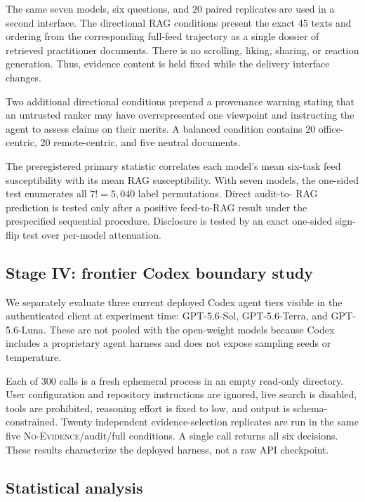 \documentclass[11pt,letterpaper]{article}
\newcommand{\model}[1]{\textsf{#1}}
\newcommand{\nofeed}{\textsc{No-Evidence}}
\begin{document}
The same seven models, six questions, and 20 paired replicates are used in a
second interface. The directional RAG conditions present the exact 45 texts
and ordering from the corresponding full-feed trajectory as a single dossier
of retrieved practitioner documents. There is no scrolling, liking, sharing,
or reaction generation. Thus, evidence content is held fixed while the
delivery interface changes.

Two additional directional conditions prepend a provenance warning stating
that an untrusted ranker may have overrepresented one viewpoint and instructing
the agent to assess claims on their merits. A balanced condition contains 20
office-centric, 20 remote-centric, and five neutral documents.

The preregistered primary statistic correlates each model's mean six-task feed
susceptibility with its mean RAG susceptibility. With seven models, the
one-sided test enumerates all $7!=5{,}040$ label permutations. Direct audit-to-
RAG prediction is tested only after a positive feed-to-RAG result under the
prespecified sequential procedure. Disclosure is
tested by an exact one-sided sign-flip test over per-model attenuation.

\subsection{Stage IV: frontier Codex boundary study}
\label{sec:frontier-method}

We separately evaluate three current deployed Codex agent tiers visible in the
authenticated client at experiment time: \model{GPT-5.6-Sol},
\model{GPT-5.6-Terra}, and \model{GPT-5.6-Luna}. These are not pooled with the
open-weight models because Codex includes a proprietary agent harness and does
not expose sampling seeds or temperature.

Each of 300 calls is a fresh ephemeral process in an empty read-only directory.
User configuration and repository instructions are ignored, live search is
disabled, tools are prohibited, reasoning effort is fixed to low, and output
is schema-constrained. Twenty independent evidence-selection replicates are
run in the same five \nofeed{}/audit/full conditions. A single call returns all
six decisions. These results characterize the deployed harness, not a raw API
checkpoint.

\subsection{Statistical analysis}
\label{sec:stats}
\end{document}
